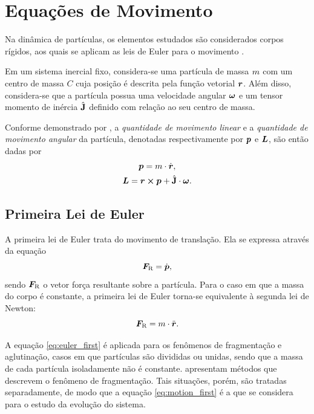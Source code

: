 \section{Equações de Movimento} \label{sec:equations_of_motion}

Na dinâmica de partículas, os elementos estudados são considerados corpos rígidos, aos quais se aplicam as leis de Euler para o movimento \cite{bib:sampaio, bib:dynamics_of_multibody_systems}.

Em um sistema inercial fixo, considera-se uma partícula de massa \(m\) com um centro de massa \(C\) cuja posição é descrita pela função vetorial \(\bm{r}\). Além disso, considera-se que a partícula possua uma velocidade angular \(\bm{\omega}\) e um tensor momento de inércia \(\hat{\mathbf{J}}\) definido com relação ao seu centro de massa.

Conforme demonstrado por , a \textit{quantidade de movimento linear} e a \textit{quantidade de movimento angular} da partícula, denotadas respectivamente por \(\bm{p}\) e \(\bm{L}\), são então dadas por
\begin{gather*}
	\linearMomentum = \mass\cdot\velocity, \\
	\angularMomentum = \position\cross\linearMomentum + \tensorOfInertia\cdot\angularVelocity.
\end{gather*}

\subsection{Primeira Lei de Euler}

A primeira lei de Euler trata do movimento de translação. Ela se expressa através da equação
\begin{equation} \label{eq:euler_first}
	\resultingForce = \deriv{1}{\linearMomentum},
\end{equation}
sendo \(\bm{F}_{\text{R}}\) o vetor força resultante sobre a partícula. Para o caso em que a massa do corpo é constante, a primeira lei de Euler torna-se equivalente à segunda lei de Newton:
\begin{equation} \label{eq:motion_first}
	\resultingForce = \mass\cdot\acceleration.
\end{equation}

A equação \eqref{eq:euler_first} é aplicada para os fenômenos de fragmentação e aglutinação, casos em que partículas são divididas ou unidas, sendo que a massa de cada partícula isoladamente não é constante.  apresentam métodos que descrevem o fenômeno de fragmentação. Tais situações, porém, são tratadas separadamente, de modo que a equação \eqref{eq:motion_first} é a que se considera para o estudo da evolução do sistema.

